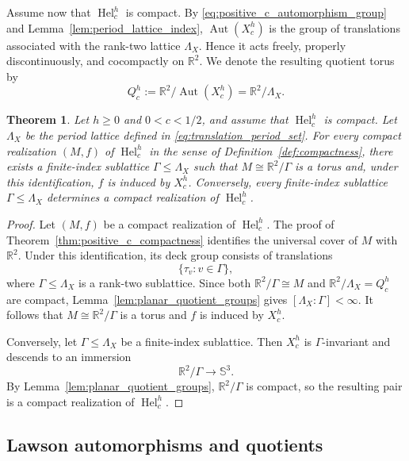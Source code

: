 \documentclass[a4paper,11pt]{amsart}
\numberwithin{equation}{section}
\theoremstyle{plain}
\newtheorem{thm}{Theorem}[section]
\begin{document}
Assume now that $\operatorname{Hel}_c^h$ is compact. By
\eqref{eq:positive_c_automorphism_group} and
Lemma~\ref{lem:period_lattice_index}, $\operatorname{Aut}(X_c^h)$ is the
group of translations associated with the rank-two lattice $\Lambda_X$.
Hence it acts
freely, properly discontinuously, and cocompactly on $\mathbb R^2$. We denote the resulting quotient torus by
\begin{equation}\label{eq:positive_c_automorphism_quotient}
Q_c^h
:=
\mathbb R^2/\operatorname{Aut}(X_c^h)
=
\mathbb R^2/\Lambda_X.
\end{equation}
\begin{thm}
\label{thm:positive_c_compact_realization_classification}
Let $h\geq0$ and $0<c<1/2$, and assume that
$\operatorname{Hel}_c^h$ is compact. Let
$\Lambda_X$ be the period lattice defined in
\eqref{eq:translation_period_set}. For every compact realization $(M,f)$ of
$\operatorname{Hel}_c^h$ in the sense of
Definition~\ref{def:compactness}, there exists a finite-index
sublattice $\Gamma\leq\Lambda_X$ such that
$M\cong\mathbb R^2/\Gamma$ is a torus
and, under this identification, $f$ is induced by $X_c^h$.
Conversely, every finite-index sublattice
$\Gamma\leq\Lambda_X$ determines a compact realization of
$\operatorname{Hel}_c^h$.
\end{thm}

\begin{proof}
Let $(M,f)$ be a compact realization of
$\operatorname{Hel}_c^h$. The proof of
Theorem~\ref{thm:positive_c_compactness} identifies the universal
cover of $M$ with $\mathbb R^2$. Under this identification, its deck
group consists of translations
\[
\{\tau_v:v\in\Gamma\},
\]
where $\Gamma\leq\Lambda_X$ is a rank-two sublattice. Since both $\mathbb R^2/\Gamma\cong M$ and
$\mathbb R^2/\Lambda_X=Q_c^h$ are compact,
Lemma~\ref{lem:planar_quotient_groups} gives
$[\Lambda_X:\Gamma]<\infty$.
It follows that
$M\cong\mathbb R^2/\Gamma$ is a torus
and $f$ is induced by $X_c^h$.

Conversely, let $\Gamma\leq\Lambda_X$ be a finite-index sublattice.
Then $X_c^h$ is $\Gamma$-invariant and descends to an immersion
\[
\mathbb R^2/\Gamma\longrightarrow\mathbb S^3.
\]
By Lemma~\ref{lem:planar_quotient_groups},
$\mathbb R^2/\Gamma$ is compact, so the resulting pair is a compact
realization of $\operatorname{Hel}_c^h$.
\end{proof}

\subsection{Lawson automorphisms and quotients}
\end{document}
